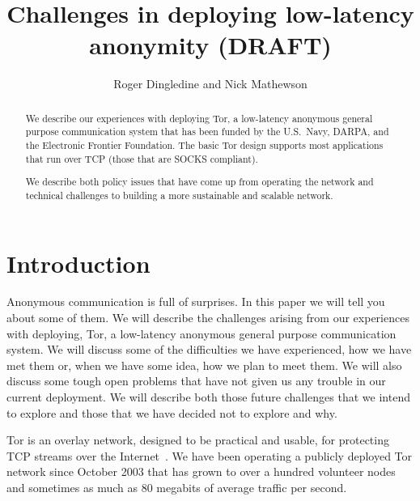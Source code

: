 \documentclass{llncs}
\begin{document}
\title{Challenges in deploying low-latency anonymity (DRAFT)}

\author{Roger Dingledine and Nick Mathewson}

\maketitle
\pagestyle{empty}

\begin{abstract}
  
  We describe our experiences with deploying Tor, a low-latency
  anonymous general purpose communication system that has been funded
  by the U.S.~Navy, DARPA, and the Electronic Frontier Foundation. The
  basic Tor design supports most applications that run over TCP (those
  that are SOCKS compliant).


We describe both policy issues that have come up from operating the
network and technical challenges to building a more sustainable and
scalable network.

\end{abstract}

\section{Introduction}

Anonymous communication is full of surprises. In this paper we will
tell you about some of them. We will describe the challenges arising
from our experiences with deploying, Tor, a low-latency anonymous general
purpose communication system. We will discuss some of the difficulties
we have experienced, how we have met them or, when we have some idea,
how we plan to meet them. We will also discuss some tough open
problems that have not given us any trouble in our current deployment.
We will describe both those future challenges that we intend to explore and
those that we have decided not to explore and why.

Tor is an overlay network, designed
to be practical and usable, for protecting TCP streams over the
Internet~\cite{tor-design}. We have been operating a publicly deployed
Tor network since October 2003 that has grown to over a hundred volunteer
nodes and sometimes as much as 80 megabits of average traffic per second.
\end{document}
